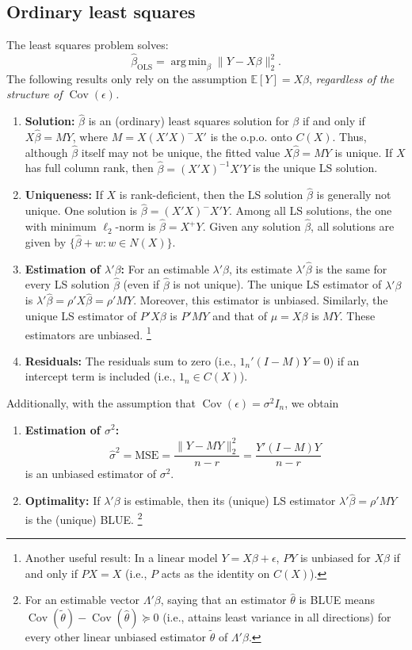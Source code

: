 \documentclass{article}
\theoremstyle{break}
\newcommand{\E}{\ensuremath{\mathbb{E}}}
\DeclareMathOperator{\Cov}{Cov}
\DeclareMathOperator*{\argmin}{arg\,min}
\begin{document}
\subsection{Ordinary least squares}\label{sec:lm-ols}
The least squares problem solves:
\[
\hat\beta_{\mathrm{OLS}} = \argmin_\beta \|Y-X\beta\|_2^2.
\]
The following results only rely on the assumption $\E[Y] = X\beta$, \emph{regardless of the structure of $\Cov(\epsilon)$.}
\begin{enumerate}
    \item \textbf{Solution:} $\hat\beta$ is an (ordinary) least squares solution for $\beta$ if and only if $X\hat\beta = MY$, where $M = X(X'X)^-X'$ is the o.p.o. onto $C(X)$. Thus, although $\hat\beta$ itself may not be unique, the fitted value $X\hat\beta = MY$ is unique.
    If $X$ has full column rank, then $\hat\beta = (X'X)^{-1} X'Y$ is the unique LS solution.
    \item \textbf{Uniqueness:} If $X$ is rank-deficient, then the LS solution $\hat\beta$ is generally not unique. One solution is $\hat\beta = (X'X)^- X'Y$. Among all LS solutions, the one with minimum $\ell_2$-norm is $\hat\beta= X^+Y$. Given any solution $\hat\beta$, all solutions are given by $\{\hat\beta+w:w\in N(X)\}$.
    \item \textbf{Estimation of $\lambda'\beta$:} For an estimable $\lambda'\beta$, its estimate $\lambda'\hat\beta$ is the same for every LS solution $\hat\beta$ (even if $\hat\beta$ is not unique). 
    The unique LS estimator of $\lambda'\beta$ is $\lambda'\hat\beta = \rho'X\hat\beta = \rho'MY$. Moreover, this estimator is unbiased.
    Similarly, the unique LS estimator of $P'X\beta$ is $P'MY$ and that of $\mu = X\beta$ is $MY$. These estimators are unbiased.
    \footnote{Another useful result: In a linear model $Y = X\beta + \epsilon$, $PY$ is unbiased for $X\beta$ if and only if $PX=X$ (i.e., $P$ acts as the identity on $C(X)$).} 
    \item \textbf{Residuals:} The residuals sum to zero (i.e., $1_n'(I-M)Y=0$) if an intercept term is included (i.e., $1_n \in C(X)$).
\end{enumerate}

Additionally, with the assumption that $\Cov(\epsilon) = \sigma^2 I_n$, we obtain
\begin{enumerate}
    \item \textbf{Estimation of $\sigma^2$:} 
    \[
    \hat\sigma^2 = \text{MSE} = \frac{\|Y - MY\|_2^2}{n-r} = \frac{Y'(I-M)Y}{n-r}
    \]
    is an unbiased estimator of $\sigma^2$.
    \item \textbf{Optimality:} If $\lambda'\beta$ is estimable, then its (unique) LS estimator $\lambda'\hat\beta = \rho'MY$ is the (unique) BLUE.
    \footnote{For an estimable vector $\Lambda'\beta$, saying that an estimator \(\hat\theta\) is BLUE means $\Cov(\tilde\theta)-\Cov(\hat\theta) \succeq 0 $ (i.e., attains least variance in all directions) for every other linear unbiased estimator $\tilde\theta$ of $\Lambda'\beta$.}
\end{enumerate}
\end{document}
